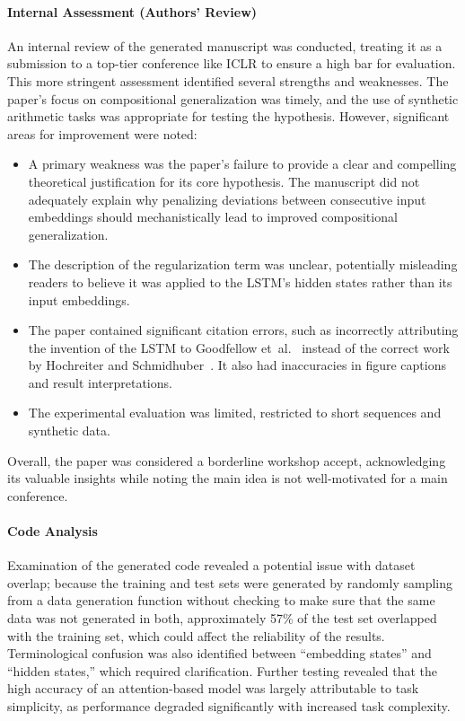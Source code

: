 \begin{appendices}
\paragraph{Internal Assessment (Authors' Review)}
An internal review of the generated manuscript was conducted, treating it as a submission to a top-tier conference like ICLR to ensure a high bar for evaluation. This more stringent assessment identified several strengths and weaknesses. The paper's focus on compositional generalization was timely, and the use of synthetic arithmetic tasks was appropriate for testing the hypothesis. However, significant areas for improvement were noted:
\begin{itemize}
\item A primary weakness was the paper's failure to provide a clear and compelling theoretical justification for its core hypothesis. The manuscript did not adequately explain why penalizing deviations between consecutive input embeddings should mechanistically lead to improved compositional generalization.
\item The description of the regularization term was unclear, potentially misleading readers to believe it was applied to the LSTM's hidden states rather than its input embeddings.
\item The paper contained significant citation errors, such as incorrectly attributing the invention of the LSTM to Goodfellow et~al.~\citep{goodfellow2016deep} instead of the correct work by Hochreiter and Schmidhuber~\citep{hochreiter1997long}. It also had inaccuracies in figure captions and result interpretations.
\item The experimental evaluation was limited, restricted to short sequences and synthetic data.
\end{itemize}
Overall, the paper was considered a borderline workshop accept, acknowledging its valuable insights while noting the main idea is not well-motivated for a main conference.
\paragraph{Code Analysis}
Examination of the generated code revealed a potential issue with dataset overlap; because the training and test sets were generated by randomly sampling from a data generation function without checking to make sure that the same data was not generated in both, approximately 57\% of the test set overlapped with the training set, which could affect the reliability of the results. Terminological confusion was also identified between ``embedding states'' and ``hidden states,'' which required clarification. Further testing revealed that the high accuracy of an attention-based model was largely attributable to task simplicity, as performance degraded significantly with increased task complexity.


\end{appendices}
